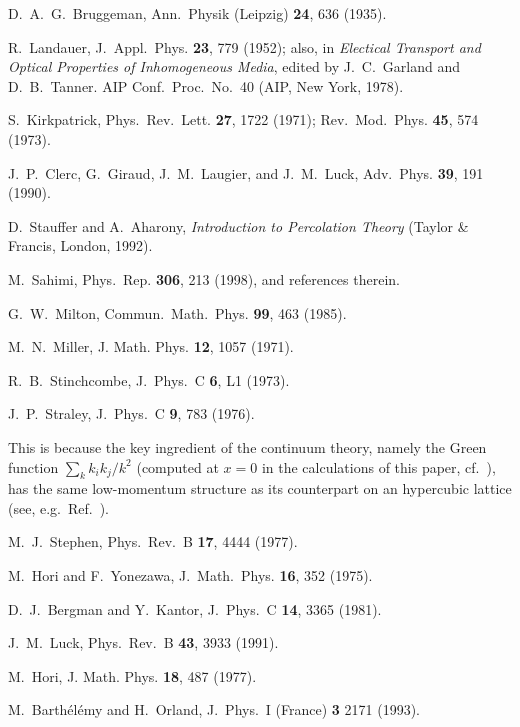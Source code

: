 \begin{references}
 D.~A.~G.~Bruggeman, Ann.\ Physik (Leipzig) 
{\bf 24}, 636 (1935).

 R.~Landauer, J.~Appl.~Phys. {\bf 23}, 779 (1952); 
also, in {\it Electical Transport and Optical Properties of 
Inhomogeneous Media}, edited by J.~C.~Garland and D.~B.~Tanner. 
AIP Conf.~Proc.~No.\ 40 (AIP, New York, 1978). 

 S.\ Kirkpatrick, Phys.\ Rev.\ Lett. {\bf 27}, 
1722 (1971); Rev.\ Mod.\ Phys. {\bf 45}, 574 (1973).

 J.~P.~Clerc, G.~Giraud, J.~M.~Laugier, and
J.~M.~Luck, Adv.\ Phys. {\bf 39}, 191 (1990).

 D.\ Stauffer and A.\ Aharony, 
{\em Introduction to Percolation Theory} (Taylor \& Francis, London, 1992). 

 M.\ Sahimi, Phys.\ Rep. {\bf 306}, 213 (1998), 
and references therein.

 G.\ W.\ Milton, Commun.\ Math.\ Phys. {\bf 99}, 463
(1985).

 M.~N.~Miller, J. Math. Phys. {\bf 12}, 1057 (1971).

 R.~B.~Stinchcombe, J.\ Phys.\ C {\bf 6}, L1 (1973).

 J.~P.~Straley, J.\ Phys.\ C {\bf 9}, 783 (1976). 

 This is because the key ingredient of the continuum 
theory, namely the Green function $\sum_k k_i k_j/k^2$ (computed at $x=0$ 
in the calculations of this paper, cf.\ \cite{NOTE2}), 
has the same low-momentum structure as its counterpart on an 
hypercubic lattice (see, e.g.\ Ref.\ \cite{LUCK91}).

 M.~J.~Stephen, Phys.\ Rev.\ B {\bf 17}, 4444 (1977).

 M.~Hori and F.~Yonezawa, J.\ Math.\ Phys.  {\bf 16},
352 (1975).

 D.~J.~Bergman and Y.~Kantor, J.\ Phys.\ C {\bf 14},
3365 (1981).

 J.~M.~Luck, Phys.\ Rev.\ B {\bf 43}, 3933 (1991).

 M.~Hori, J. Math. Phys. {\bf 18}, 487 (1977).

 M.~Barth\'el\'emy and H.~Orland, J.\ Phys.\ I
(France) {\bf 3} 2171 (1993).


\end{references}
